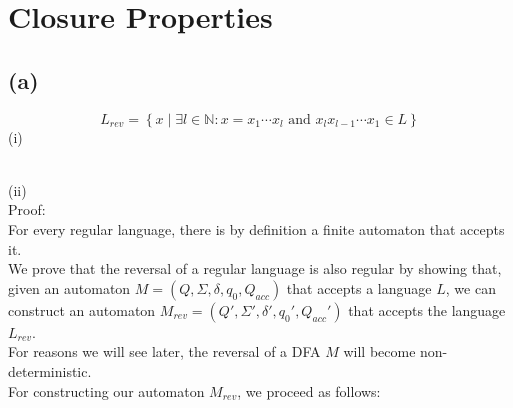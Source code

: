 



\setcounter{section}{2}
\section{Closure Properties}
\subsection{(a)}
$$L_{rev} = \left\{x\mid \exists l \in \mathbb{N}: x = x_{1}\cdots x_{l} \text{ and } x_{l}x_{l-1}\cdots x_{1} \in L\right\}$$
\noindent (i)\\
\\
\noindent (ii)\\
Proof:\\
For every regular language, there is by definition a finite automaton that accepts it.\\
We prove that the reversal of a regular language is also regular by showing that, given an automaton $M=(Q,\Sigma,\delta,q_{0},Q_{acc})$ that accepts a language $L$, we can construct an automaton $M_{rev}=(Q',\Sigma',\delta',q_{0}',Q_{acc}')$ that accepts the language $L_{rev}$.\\
For reasons we will see later, the reversal of a DFA $M$ will become non-deterministic.\\
For constructing our automaton $M_{rev}$, we proceed as follows:
